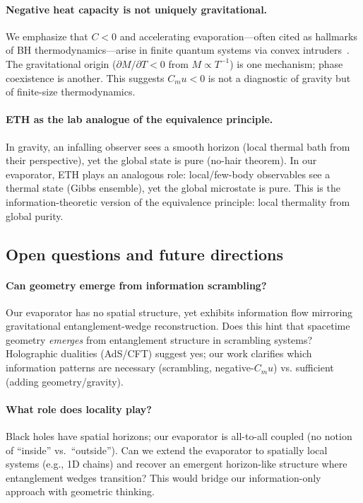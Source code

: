 \documentclass[aps,prx,onecolumn,showpacs,superscriptaddress,longbibliography,nofootinbib]{revtex4-2}
\def\mu{mu}%
\begin{document}
\paragraph{Negative heat capacity is not uniquely gravitational.}
We emphasize that $C < 0$ and accelerating evaporation---often cited as hallmarks of BH thermodynamics---arise in finite quantum systems via convex intruders~\cite{GrossBook2001,Schmidt2001Na147}. The gravitational origin ($\partial M / \partial T < 0$ from $M \propto T^{-1}$) is one mechanism; phase coexistence is another. This suggests $C_\mu < 0$ is not a diagnostic of gravity but of finite-size thermodynamics.

\paragraph{ETH as the lab analogue of the equivalence principle.}
In gravity, an infalling observer sees a smooth horizon (local thermal bath from their perspective), yet the global state is pure (no-hair theorem). In our evaporator, ETH plays an analogous role: local/few-body observables see a thermal state (Gibbs ensemble), yet the global microstate is pure. This is the information-theoretic version of the equivalence principle: local thermality from global purity.

\subsection{Open questions and future directions}

\paragraph{Can geometry emerge from information scrambling?}
Our evaporator has no spatial structure, yet exhibits information flow mirroring gravitational entanglement-wedge reconstruction. Does this hint that spacetime geometry \emph{emerges} from entanglement structure in scrambling systems? Holographic dualities (AdS/CFT) suggest yes; our work clarifies which information patterns are necessary (scrambling, negative-$C_\mu$) vs. sufficient (adding geometry/gravity).

\paragraph{What role does locality play?}
Black holes have spatial horizons; our evaporator is all-to-all coupled (no notion of ``inside'' vs.\ ``outside''). Can we extend the evaporator to spatially local systems (e.g., 1D chains) and recover an emergent horizon-like structure where entanglement wedges transition? This would bridge our information-only approach with geometric thinking.
\end{document}
